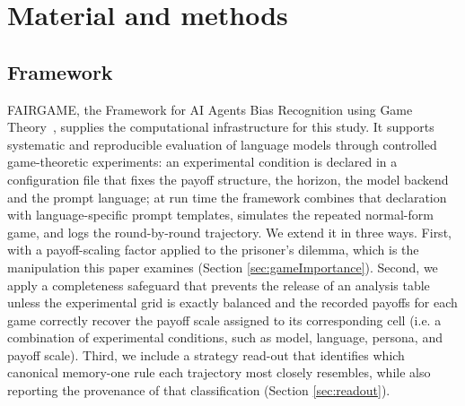 \documentclass[11pt,a4paper]{article}
\begin{document}


\section{Material and methods}\label{sec:methodology}

\subsection{Framework}\label{sec:background}

FAIRGAME, the Framework for AI Agents Bias Recognition using Game
Theory~\cite{buscemi2025fairgame}, supplies the computational infrastructure
for this study. It supports systematic and reproducible evaluation of language
models through controlled game-theoretic experiments: an experimental condition
is declared in a configuration file that fixes the payoff structure, the
horizon, the model backend and the prompt language; at run time the framework
combines that declaration with language-specific prompt templates, simulates
the repeated normal-form game, and logs the round-by-round trajectory. We
extend it in three ways. First, with a payoff-scaling factor applied to the
prisoner's dilemma, which is the manipulation this paper examines 
(Section \ref{sec:gameImportance}). Second,  we apply a completeness safeguard that prevents the release of an analysis table unless the experimental grid is exactly balanced and the recorded payoffs for each game correctly recover the payoff scale assigned to its corresponding cell (i.e. a  combination of experimental conditions, such as model, language, persona, and payoff scale). Third, we include a strategy read-out that identifies which canonical memory-one rule each trajectory most closely resembles, while also reporting the provenance of that classification (Section \ref{sec:readout}).
\end{document}
